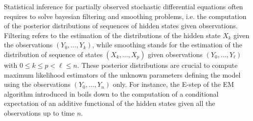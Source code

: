 \documentclass[12pt,draft]{article}
\newcommand{\rmd}{\mathrm{d}}
\newcommand{\eqsp}{\;}
\newcommand{\1}{\mathrm{1}}
\newcommand{\qk}{q_{k}}
\begin{document}
Statistical inference for partially observed stochastic differential equations often requires to solve bayesian filtering and smoothing problems, i.e. the computation of the posterior distributions of sequences of hidden states given observations. Filtering refers to the estimation of the distributions of the hidden state $X_k$ given the observations $(Y_0,\ldots,Y_k)$, while smoothing stands for the estimation of the distribution of sequence of states $(X_{k},\ldots,X_{p})$ given observations $(Y_{0},\ldots,Y_{\ell})$ with $0\le k\le p<\ell \le n$. 
These posterior distributions are crucial to compute maximum likelihood estimators of the unknown parameters defining the model using the observations $(Y_0,\ldots,Y_n)$ only.
For instance, the E-step of the EM algorithm introduced in \cite{dempster:laird:rubin:1977} %
boils down to the computation of a conditional expectation of an additive functional of the hidden states given all the observations up to time $n$. 
\end{document}

